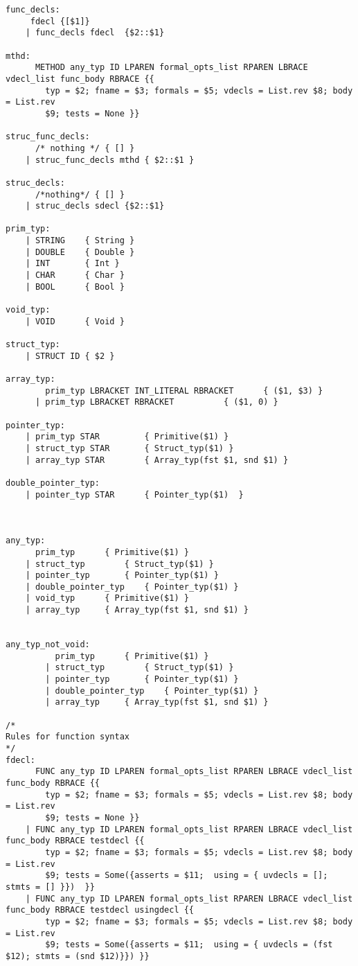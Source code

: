 \documentclass{article}
\begin{document}
\begin{lstlisting}
func_decls:	
	 fdecl {[$1]}
	| func_decls fdecl  {$2::$1}

mthd:
	  METHOD any_typ ID LPAREN formal_opts_list RPAREN LBRACE vdecl_list func_body RBRACE {{
		typ = $2; fname = $3; formals = $5; vdecls = List.rev $8; body = List.rev
		$9; tests = None }}

struc_func_decls:
	  /* nothing */ { [] }
	| struc_func_decls mthd { $2::$1 } 

struc_decls:
	  /*nothing*/ { [] }
	| struc_decls sdecl {$2::$1}

prim_typ:
	| STRING 	{ String }
	| DOUBLE 	{ Double }
	| INT 		{ Int }
	| CHAR 		{ Char }
	| BOOL		{ Bool }

void_typ:
	| VOID 		{ Void }
	
struct_typ:
	| STRUCT ID { $2 }

array_typ:
	    prim_typ LBRACKET INT_LITERAL RBRACKET  	{ ($1, $3) }
	  | prim_typ LBRACKET RBRACKET  		{ ($1, 0) }

pointer_typ:
	| prim_typ STAR 		{ Primitive($1) }
	| struct_typ STAR 		{ Struct_typ($1) }
	| array_typ STAR 		{ Array_typ(fst $1, snd $1) }

double_pointer_typ:
	| pointer_typ STAR 		{ Pointer_typ($1)  }



any_typ:
	  prim_typ 		{ Primitive($1) }
	| struct_typ 		{ Struct_typ($1) }
	| pointer_typ 		{ Pointer_typ($1) }
	| double_pointer_typ 	{ Pointer_typ($1) }
	| void_typ 		{ Primitive($1) }
	| array_typ		{ Array_typ(fst $1, snd $1) }


any_typ_not_void:
	  	  prim_typ 		{ Primitive($1) }
		| struct_typ 		{ Struct_typ($1) }
		| pointer_typ 		{ Pointer_typ($1) }
		| double_pointer_typ 	{ Pointer_typ($1) }
		| array_typ		{ Array_typ(fst $1, snd $1) }

/* 
Rules for function syntax
*/
fdecl:
	  FUNC any_typ ID LPAREN formal_opts_list RPAREN LBRACE vdecl_list func_body RBRACE {{
		typ = $2; fname = $3; formals = $5; vdecls = List.rev $8; body = List.rev
		$9; tests = None }}
	| FUNC any_typ ID LPAREN formal_opts_list RPAREN LBRACE vdecl_list func_body RBRACE testdecl {{
		typ = $2; fname = $3; formals = $5; vdecls = List.rev $8; body = List.rev
		$9; tests = Some({asserts = $11;  using = { uvdecls = []; stmts = [] }})  }}
	| FUNC any_typ ID LPAREN formal_opts_list RPAREN LBRACE vdecl_list func_body RBRACE testdecl usingdecl {{
		typ = $2; fname = $3; formals = $5; vdecls = List.rev $8; body = List.rev
		$9; tests = Some({asserts = $11;  using = { uvdecls = (fst $12); stmts = (snd $12)}}) }}


\end{lstlisting}
\end{document}
